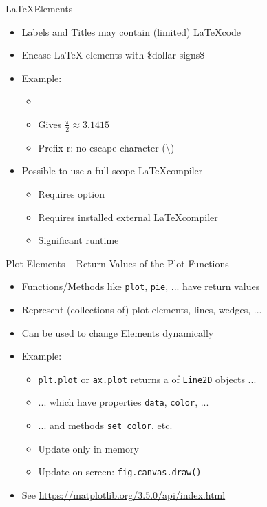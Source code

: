 
\begin{frame}[fragile]{\LaTeX Elements}
%
\begin{itemize}
\item Labels and Titles may contain (limited) \LaTeX code
\item Encase \LaTeX\xspace elements with \$dollar signs\$
\item Example:
	\begin{itemize}
	\item {}
	\item Gives $\scriptstyle \frac {\pi }{2} \approx 3.1415$
	\item Prefix r: no escape character (\textbackslash)
	\end{itemize}
\item Possible to use a full scope \LaTeX compiler
	\begin{itemize}
	\item Requires option 
	\item Requires installed external \LaTeX compiler
	\item Significant runtime
	\end{itemize}
\end{itemize}
%
\end{frame}


\begin{frame}[fragile]{Plot Elements -- Return Values of the Plot Functions}
%
\begin{itemize}
\item Functions/Methods like \texttt{plot}, \texttt{pie}, ... have return values
\item Represent (collections of) plot elements, \eg lines, wedges, ...
\item Can be used to change Elements dynamically
\item Example:
	\begin{itemize}
	\item \texttt{plt.plot} or \texttt{ax.plot} returns a  of \texttt{Line2D} objects ...
	\item ... which have properties \texttt{data}, \texttt{color}, ...
	\item ... and methods \texttt{set\_color}, etc.
	\item Update only in memory
	\item Update on screen: \texttt{fig.canvas.draw()}
	\end{itemize}
\item See \url{https://matplotlib.org/3.5.0/api/index.html}
\end{itemize}
%
\end{frame}

